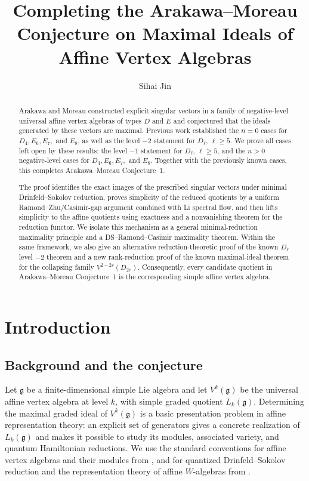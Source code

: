 \documentclass[11pt,reqno]{amsart}
\title[Completing the Arakawa--Moreau conjecture]
{Completing the Arakawa--Moreau Conjecture on Maximal Ideals of Affine Vertex Algebras}
\author{Sihai Jin}
\date{}
\theoremstyle{definition}
\theoremstyle{remark}
\begin{document}
\begin{abstract}
	Arakawa and Moreau constructed explicit singular vectors in a family of
	negative-level universal affine vertex algebras of types $D$ and $E$ and
	conjectured that the ideals generated by these vectors are maximal.
	Previous work established the $n=0$ cases for
	$D_4,E_6,E_7,$ and $E_8$, as well as the level $-2$ statement for
	$D_\ell$, $\ell\ge5$.  We prove all cases left open by these results:
	the level $-1$ statement for $D_\ell$, $\ell\ge5$, and the $n>0$
	negative-level cases for $D_4,E_6,E_7,$ and $E_8$.  Together with the
	previously known cases, this completes Arakawa--Moreau Conjecture~1.
	
	The proof identifies the exact images of the prescribed singular vectors
	under minimal Drinfeld--Sokolov reduction, proves simplicity of the reduced
	quotients by a uniform Ramond--Zhu/Casimir-gap argument combined with Li
	spectral flow, and then lifts simplicity to the affine quotients using
	exactness and a nonvanishing theorem for the reduction functor.  We isolate
	this mechanism as a general minimal-reduction maximality principle and a
	DS--Ramond--Casimir maximality theorem.  Within the same framework, we also
	give an alternative reduction-theoretic proof of the known
	$D_\ell$ level $-2$ theorem and a new rank-reduction proof of the known
	maximal-ideal theorem for the collapsing family $V^{2-2r}(D_{2r})$.
	Consequently, every candidate quotient in Arakawa--Moreau Conjecture~1 is
	the corresponding simple affine vertex algebra.
\end{abstract}

\maketitle
\tableofcontents
\section{Introduction}


\subsection{Background and the conjecture}

Let $\mathfrak g$ be a finite-dimensional simple Lie algebra and let
$V^k(\mathfrak g)$ be the universal affine vertex algebra at level $k$,
with simple graded quotient $L_k(\mathfrak g)$.  Determining the maximal
graded ideal of $V^k(\mathfrak g)$ is a basic presentation problem in
affine representation theory: an explicit set of generators gives a
concrete realization of $L_k(\mathfrak g)$ and makes it possible to study
its modules, associated variety, and quantum Hamiltonian reductions.  We
use the standard conventions for affine vertex algebras and their modules
from \cite{Kac1998,FrenkelBenZvi2004,FrenkelZhu1992}, and for quantized
Drinfeld--Sokolov reduction and the representation theory of affine
$W$-algebras from
\cite{KacRoanWakimoto2003,KacWakimoto2004,Arakawa2004,Arakawa2005,
Arakawa2007}.
\end{document}
